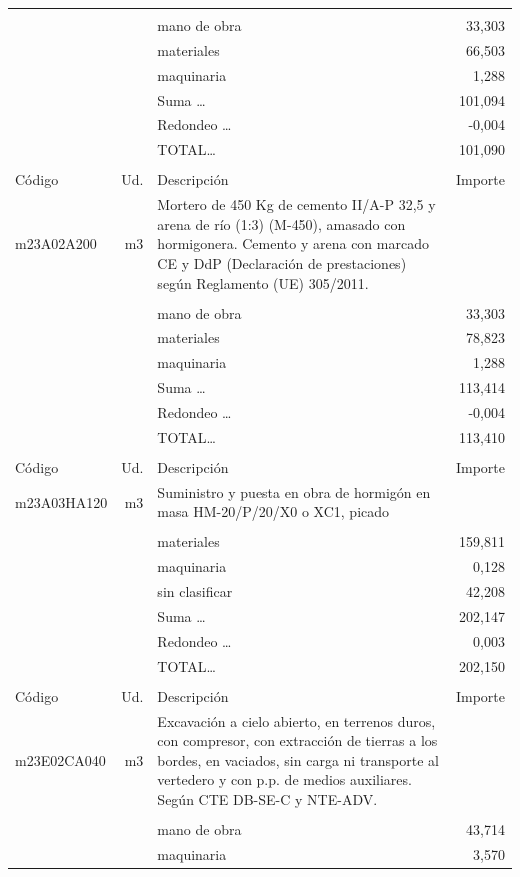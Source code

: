 \begin{supertabular}{l r p{60mm} r}
&&&\\%
&&mano de obra&    33,303\\%
&&materiales&    66,503\\%
&&maquinaria&     1,288\\%
&&Suma \ldots&   101,094\\%
&&Redondeo \ldots&    {-}0,004\\%
%
&&TOTAL\ldots&   101,090\\%
&&&\\%
Código&Ud.&Descripción&Importe\\%
\hline%
m23A02A200&m3&Mortero de 450 Kg de cemento II/A{-}P 32,5 y arena de río (1:3) (M{-}450), amasado con hormigonera. Cemento y arena con marcado CE y DdP (Declaración de prestaciones) según Reglamento (UE) 305/2011.&\\%
&&&\\%
&&mano de obra&    33,303\\%
&&materiales&    78,823\\%
&&maquinaria&     1,288\\%
&&Suma \ldots&   113,414\\%
&&Redondeo \ldots&    {-}0,004\\%
%
&&TOTAL\ldots&   113,410\\%
&&&\\%
Código&Ud.&Descripción&Importe\\%
\hline%
m23A03HA120&m3&Suministro y puesta en obra de hormigón en masa HM{-}20/P/20/X0 o XC1, picado&\\%
&&&\\%
&&materiales&   159,811\\%
&&maquinaria&     0,128\\%
&&sin clasificar&    42,208\\%
&&Suma \ldots&   202,147\\%
&&Redondeo \ldots&     0,003\\%
%
&&TOTAL\ldots&   202,150\\%
&&&\\%
Código&Ud.&Descripción&Importe\\%
\hline%
m23E02CA040&m3&Excavación a cielo abierto, en terrenos duros, con compresor, con extracción de tierras a los bordes, en vaciados, sin carga ni transporte al vertedero y con p.p. de medios auxiliares. Según CTE DB{-}SE{-}C y NTE{-}ADV.&\\%
&&&\\%
&&mano de obra&    43,714\\%
&&maquinaria&     3,570\\%

\end{supertabular}
